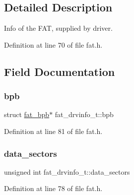 \subsection{Detailed Description}
Info of the F\+AT, supplied by driver. 

Definition at line 70 of file fat.\+h.



\subsection{Field Documentation}
\mbox{\label{structfat__drvinfo__t_a5596cc2d01bcd3405718bee044412332_a5596cc2d01bcd3405718bee044412332}} 
\subsubsection{\texorpdfstring{bpb}{bpb}}
{\footnotesize\ttfamily struct \hyperlink{structfat__bpb}{fat\+\_\+bpb}$\ast$ fat\+\_\+drvinfo\+\_\+t\+::bpb}



Definition at line 81 of file fat.\+h.

\mbox{\label{structfat__drvinfo__t_a25e043cab40af89e54687fa100b1abf1_a25e043cab40af89e54687fa100b1abf1}} 
\subsubsection{\texorpdfstring{data\+\_\+sectors}{data\_sectors}}
{\footnotesize\ttfamily unsigned int fat\+\_\+drvinfo\+\_\+t\+::data\+\_\+sectors}



Definition at line 78 of file fat.\+h.

\mbox{\label{structfat__drvinfo__t_a825f02713bdb8c993368eaf7857eff16_a825f02713bdb8c993368eaf7857eff16}} 
